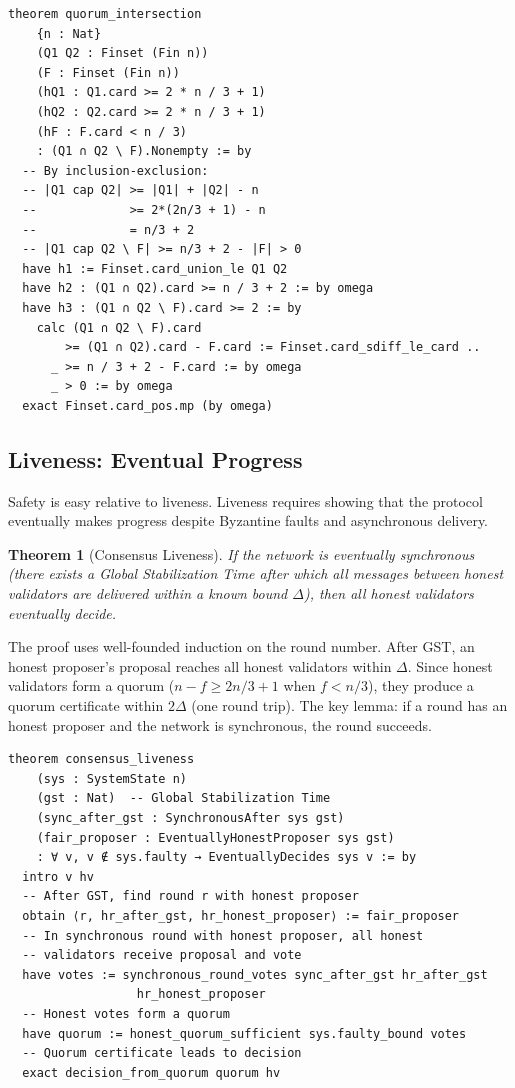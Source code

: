 \documentclass[11pt,a4paper]{article}
\newtheorem{theorem}{Theorem}
\begin{document}
\begin{lstlisting}[language=Lean,caption={Quorum intersection proof}]
theorem quorum_intersection
    {n : Nat}
    (Q1 Q2 : Finset (Fin n))
    (F : Finset (Fin n))
    (hQ1 : Q1.card >= 2 * n / 3 + 1)
    (hQ2 : Q2.card >= 2 * n / 3 + 1)
    (hF : F.card < n / 3)
    : (Q1 ∩ Q2 \ F).Nonempty := by
  -- By inclusion-exclusion:
  -- |Q1 cap Q2| >= |Q1| + |Q2| - n
  --             >= 2*(2n/3 + 1) - n
  --             = n/3 + 2
  -- |Q1 cap Q2 \ F| >= n/3 + 2 - |F| > 0
  have h1 := Finset.card_union_le Q1 Q2
  have h2 : (Q1 ∩ Q2).card >= n / 3 + 2 := by omega
  have h3 : (Q1 ∩ Q2 \ F).card >= 2 := by
    calc (Q1 ∩ Q2 \ F).card
        >= (Q1 ∩ Q2).card - F.card := Finset.card_sdiff_le_card ..
      _ >= n / 3 + 2 - F.card := by omega
      _ > 0 := by omega
  exact Finset.card_pos.mp (by omega)
\end{lstlisting}

\subsection{Liveness: Eventual Progress}

Safety is easy relative to liveness. Liveness requires showing that the protocol
eventually makes progress despite Byzantine faults and asynchronous delivery.

\begin{theorem}[Consensus Liveness]
If the network is eventually synchronous (there exists a Global Stabilization Time after
which all messages between honest validators are delivered within a known bound $\Delta$),
then all honest validators eventually decide.
\end{theorem}

The proof uses well-founded induction on the round number. After GST, an honest proposer's
proposal reaches all honest validators within $\Delta$. Since honest validators form a
quorum ($n - f \geq 2n/3 + 1$ when $f < n/3$), they produce a quorum certificate within
$2\Delta$ (one round trip). The key lemma: if a round has an honest proposer and the
network is synchronous, the round succeeds.

\begin{lstlisting}[language=Lean,caption={Liveness argument structure}]
theorem consensus_liveness
    (sys : SystemState n)
    (gst : Nat)  -- Global Stabilization Time
    (sync_after_gst : SynchronousAfter sys gst)
    (fair_proposer : EventuallyHonestProposer sys gst)
    : ∀ v, v ∉ sys.faulty → EventuallyDecides sys v := by
  intro v hv
  -- After GST, find round r with honest proposer
  obtain ⟨r, hr_after_gst, hr_honest_proposer⟩ := fair_proposer
  -- In synchronous round with honest proposer, all honest
  -- validators receive proposal and vote
  have votes := synchronous_round_votes sync_after_gst hr_after_gst
                  hr_honest_proposer
  -- Honest votes form a quorum
  have quorum := honest_quorum_sufficient sys.faulty_bound votes
  -- Quorum certificate leads to decision
  exact decision_from_quorum quorum hv
\end{lstlisting}
\end{document}
